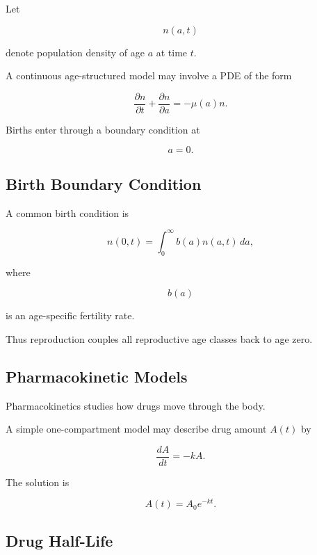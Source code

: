 Let

\[
n(a,t)
\]

denote population density of age \(a\) at time \(t\).

A continuous age-structured model may involve a PDE of the form

\[
\boxed{
\frac{\partial n}{\partial t}
+
\frac{\partial n}{\partial a}
=
-\mu(a)n.
}
\]

Births enter through a boundary condition at

\[
a=0.
\]

\subsection{Birth Boundary Condition}
\label{subsec:age-structured-birth-boundary}

A common birth condition is

\[
\boxed{
n(0,t)
=
\int_0^\infty
b(a)n(a,t)\,da,
}
\]

where

\[
b(a)
\]

is an age-specific fertility rate.

Thus reproduction couples all reproductive age classes back to age zero.

\subsection{Pharmacokinetic Models}
\label{subsec:pharmacokinetic-models}

Pharmacokinetics studies how drugs move through the body.

A simple one-compartment model may describe drug amount \(A(t)\) by

\[
\boxed{
\frac{dA}{dt}
=
-kA.
}
\]

The solution is

\[
\boxed{
A(t)=A_0e^{-kt}.
}
\]

\subsection{Drug Half-Life}
\label{subsec:drug-half-life}

